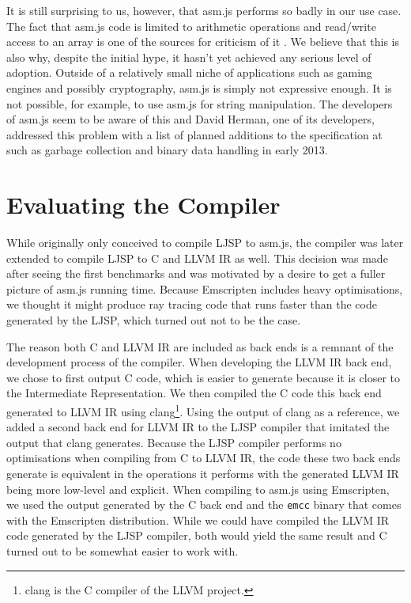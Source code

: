 \documentclass[11pt]{report}
\begin{document}
It is still surprising to us, however, that asm.js performs so badly in our use case. The fact that asm.js code is limited to arithmetic operations and read/write access to an array is one of the sources for criticism of it \cite{adblock, whybothers}. We believe that this is also why, despite the initial hype, it hasn't yet achieved any serious level of adoption. Outside of a relatively small niche of applications such as gaming engines and possibly cryptography, asm.js is simply not expressive enough. It is not possible, for example, to use asm.js for string manipulation. The developers of asm.js seem to be aware of this and David Herman, one of its developers, addressed this problem with a list of planned additions to the specification at \cite{asmjsadditions} such as garbage collection and binary data handling in early 2013.

\section{Evaluating the Compiler}


While originally only conceived to compile LJSP to asm.js, the compiler was later extended to compile LJSP to C and LLVM IR as well. This decision was made after seeing the first benchmarks and was motivated by a desire to get a fuller picture of asm.js running time. Because Emscripten includes heavy optimisations, we thought it might produce ray tracing code that runs faster than the code generated by the LJSP, which turned out not to be the case. 

The reason both C and LLVM IR are included as back ends is a remnant of the development process of the compiler. When developing the LLVM IR back end, we chose to first output C code, which is easier to generate because it is closer to the Intermediate Representation. We then compiled the C code this back end generated to LLVM IR using clang\footnote{clang is the C compiler of the LLVM project.}. Using the output of clang as a reference, we added a second back end for LLVM IR to the LJSP compiler that imitated the output that clang generates. Because the LJSP compiler performs no optimisations when compiling from C to LLVM IR, the code these two back ends generate is equivalent in the operations it performs with the generated LLVM IR being more low-level and explicit. When compiling to asm.js using Emscripten, we used the output generated by the C back end and the \texttt{emcc} binary that comes with the Emscripten distribution. While we could have compiled the LLVM IR code generated by the LJSP compiler, both would yield the same result and C turned out to be somewhat easier to work with.
\end{document}
